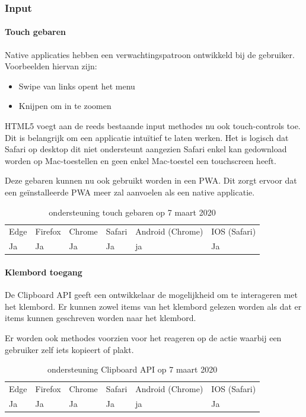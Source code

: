 \subsubsection{Input}

\paragraph{Touch gebaren}

Native applicaties hebben een verwachtingspatroon ontwikkeld bij de gebruiker. Voorbeelden hiervan zijn:

 \begin{itemize}
	\item	Swipe van links opent het menu
	\item	Knijpen om in te zoomen
\end{itemize}

HTML5 voegt aan de reeds bestaande input methodes nu ook touch-controls toe. Dit is belangrijk om een applicatie intuïtief te laten werken. Het is logisch dat Safari op desktop dit niet ondersteunt aangezien Safari enkel kan gedownload worden op Mac-toestellen en geen enkel Mac-toestel een touchscreen heeft.

Deze gebaren kunnen nu ook gebruikt worden in een PWA. Dit zorgt ervoor dat een geïnstalleerde PWA meer zal aanvoelen als een native applicatie.

\begin{table}[H]
	\centering
	\begin{tabular}{llllll}
		Edge & Firefox & Chrome & Safari & Android (Chrome) & IOS (Safari) \\
		Ja   & Ja      &  Ja     & Ja     & ja               & Ja          
	\end{tabular}	
	\caption{ondersteuning touch gebaren op 7 maart 2020}
\end{table}	

\paragraph{Klembord toegang}
De Clipboard API \autocite{Kacmarcik2010} geeft een ontwikkelaar de mogelijkheid om te interageren met het klembord. Er kunnen zowel items van het klembord gelezen worden als dat er items kunnen geschreven worden naar het klembord.

Er worden ook methodes voorzien voor het reageren op de actie waarbij een gebruiker zelf iets kopieert of plakt. 

\begin{table}[H]
	\centering
	\begin{tabular}{llllll}
		Edge & Firefox & Chrome & Safari & Android (Chrome) & IOS (Safari) \\
		Ja   & Ja      &  Ja     & Ja     & ja               & Ja          
	\end{tabular}	
	\caption{ondersteuning Clipboard API op 7 maart 2020}
\end{table}	


